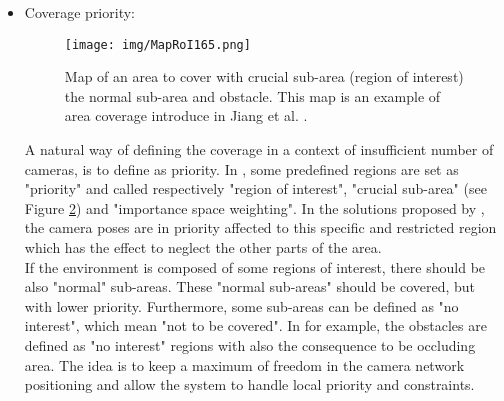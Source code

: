 \begin{itemize}
\begin{figure}[t!]
  \caption{Illustration of " path to cover" by of Nikolaidis et al. \cite{81*nikolaidis2009}. The aim is to focus on cover a road (walking path) in a small room by using only 3 cameras. }\label{fig:pathToCover81}
  \endminipage\hfill
\end{figure}
   The point here is to observe the entire trajectory commonly taken by users (car, pedestrian, …). When the area to cover is a well-known place, the main trajectory taken by the users can be estimated or extracted \cite{27*bodor2005}. If the area to cover is a road, for instance, then the trajectory of the driver is known \cite{14*lu2011}. In this condition, the aim is to cover the common trajectory of the user as presented in  \cite{14*lu2011,27*bodor2005,30*bodor2005,81*nikolaidis2009} (see the Figure \ref{fig:pathToCover81}). The path coverage is interesting due to the restricted area to cover: not an entire area, but only a path within a given area, that can be seen as a priority sub-area. \\
   \item Coverage priority: \\
      \begin{figure}[t!]
\center
{}
   \texttt{[image: img/MapRoI165.png]}
  \caption{Map of an area to cover with crucial sub-area (region of interest) the normal sub-area  and obstacle. This map is an example of area coverage  introduce in  Jiang et al. \cite{165*jiang2010}. }\label{fig:MapRoI165}
  \endminipage\hfill
\end{figure}
   A natural way of defining the coverage in a context of insufficient number of cameras, is to define as priority.
    In \cite{84*xu2011,165*jiang2010,171*horster2006}, some predefined regions are set as "priority" and called respectively "region of interest", "crucial sub-area" (see Figure \ref{fig:MapRoI165}) and "importance space weighting".  In the solutions proposed  by \cite{84*xu2011,165*jiang2010,171*horster2006}, the camera poses are in priority affected to this specific and restricted region which has the effect to neglect the other parts of the area. \\
If the environment is composed of some regions of interest, there should be also "normal" sub-areas. These "normal sub-areas" should be covered, but with lower priority. Furthermore, some  sub-areas can be defined as "no interest", which mean "not to be covered". In \cite{165*jiang2010,171*horster2006} for example, the obstacles are defined as "no interest" regions with also the consequence to  be occluding area. The idea is to keep a maximum of freedom in the camera network positioning and allow the system to handle local priority and constraints.\\

\end{itemize}
